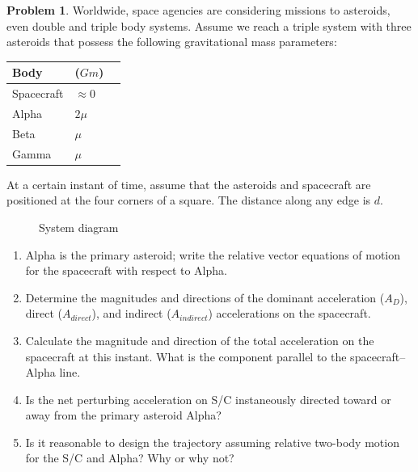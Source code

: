\documentclass[10pt]{article}
\theoremstyle{definition}
\newtheorem{prob}{Problem}[section]
\newenvironment{subprob}%
{\renewcommand{\theenumi}{\alph{enumi}}\renewcommand{\labelenumi}{(\theenumi)}\begin{enumerate}}%
{\end{enumerate}}%
\begin{document}
\clearpage\newpage
\begin{prob}
    Worldwide, space agencies are considering missions to asteroids, even double and triple body systems. 
    Assume we reach a triple system with three asteroids that possess the following gravitational mass parameters:

    \begin{center}
\begin{tabular}{llr}  
\toprule
Body & (\( Gm\)) \\
\midrule
Spacecraft & \( \approx 0 \) \\
Alpha & \( 2 \mu \) \\
Beta & \( \mu \) \\
Gamma & \( \mu \) \\
\bottomrule
\end{tabular}
\end{center}

At a certain instant of time, assume that the asteroids and spacecraft are positioned at the four corners of a square. 
The distance along any edge is \( d\).
\begin{figure}[htbp]
    \centering
{}
\caption{System diagram}
\end{figure}

\begin{subprob}
    \item Alpha is the primary asteroid; write the relative vector equations of motion for the spacecraft with respect to Alpha.
    \item Determine the magnitudes and directions of the dominant acceleration (\(A_D\)), direct (\(A_{direct}\)), and indirect (\(A_{indirect}\)) accelerations on the spacecraft.
    \item Calculate the magnitude and direction of the total acceleration on the spacecraft at this instant. 
        What is the component parallel to the spacecraft--Alpha line.
    \item Is the net perturbing acceleration on S/C instaneously directed toward or away from the primary asteroid Alpha?

    \item Is it reasonable to design the trajectory assuming relative two-body motion for the S/C and Alpha?
        Why or why not?
\end{subprob}
\end{prob}
\end{document}
